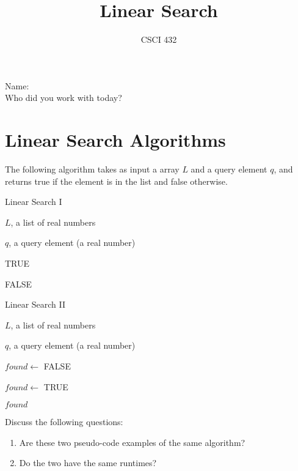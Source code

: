 \documentclass{article}
\title{Linear Search}
\author{CSCI 432}
\begin{document}
\maketitle

\noindent
Name:\\
Who did you work with today?

\section*{Linear Search Algorithms}

The following algorithm takes as input a array $L$ and a query element $q$, and returns
true if the element is in the list and false otherwise.

\begin{algorithm}[h]
    \caption{Linear Search I}
    \begin{algorithmic}[1]
        \REQUIRE $L$, a list of real numbers

        \ENSURE $q$, a query element (a real number)

                \RETURN TRUE
            \ENDIF
        \ENDFOR

        \RETURN FALSE

    \end{algorithmic}
\end{algorithm}

\begin{algorithm}[h]
    \caption{Linear Search II}
    \begin{algorithmic}[1]
        \REQUIRE $L$, a list of real numbers

        \ENSURE $q$, a query element (a real number)

        \STATE $found \gets$ FALSE

                \STATE $found \gets$ TRUE
            \ENDIF
        \ENDFOR

        \RETURN $found$

    \end{algorithmic}
\end{algorithm}



Discuss the following questions:

\begin{enumerate}
    \item Are these two pseudo-code examples of the same algorithm?
    \item Do the two have the same runtimes?
\end{enumerate}
\end{document}
